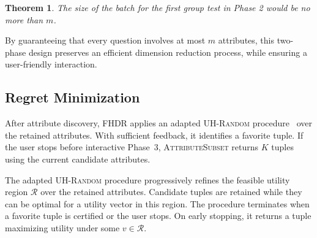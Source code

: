 \documentclass[conference]{IEEEtran}
\newtheorem{theorem}{Theorem}[section]
\theoremstyle{definition}
\theoremstyle{plain}
\begin{document}
\begin{theorem}\label{theorem_batch}
    The size of the batch for the first group test in Phase 2 would be no more than $m$.
\end{theorem}

By guaranteeing that every question involves at most $m$ attributes, this two-phase design preserves an efficient dimension reduction process, while ensuring a user-friendly interaction.

\FloatBarrier

\subsection{Regret Minimization}
\label{subsec:re_min}

After attribute discovery, FHDR applies an adapted \textsc{UH-Random} procedure~\cite{XCL19} over the retained attributes. With sufficient feedback, it identifies a favorite tuple. If the user stops before interactive Phase~3, \textsc{AttributeSubset} returns $K$ tuples using the current candidate attributes.

The adapted \textsc{UH-Random} procedure progressively refines the feasible utility region $\mathcal{R}$ over the retained attributes. Candidate tuples are retained while they can be optimal for a utility vector in this region. The procedure terminates when a favorite tuple is certified or the user stops. On early stopping, it returns a tuple maximizing utility under some $v\in\mathcal{R}$.
\end{document}
